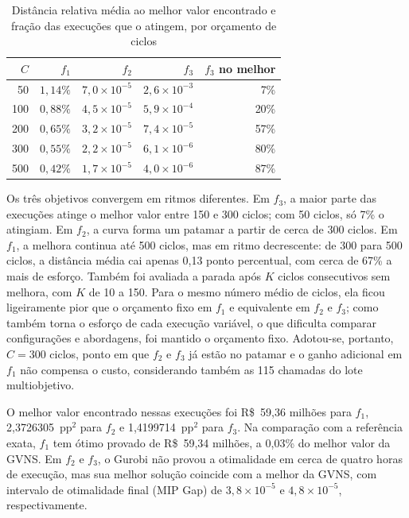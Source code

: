 \documentclass[conference]{IEEEtran}
\begin{document}
\begin{table}[htbp]
\caption{Distância relativa média ao melhor valor encontrado e fração das execuções que o atingem, por orçamento de ciclos}
\centering
\begin{tabular}{r r r r r}
\toprule
\textbf{$C$} & \textbf{$f_1$} & \textbf{$f_2$} & \textbf{$f_3$} & \textbf{$f_3$ no melhor} \\
\midrule
50 & $1{,}14\%$ & $7{,}0\times10^{-5}$ & $2{,}6\times10^{-3}$ & 7\% \\
100 & $0{,}88\%$ & $4{,}5\times10^{-5}$ & $5{,}9\times10^{-4}$ & 20\% \\
200 & $0{,}65\%$ & $3{,}2\times10^{-5}$ & $7{,}4\times10^{-5}$ & 57\% \\
300 & $0{,}55\%$ & $2{,}2\times10^{-5}$ & $6{,}1\times10^{-6}$ & 80\% \\
500 & $0{,}42\%$ & $1{,}7\times10^{-5}$ & $4{,}0\times10^{-6}$ & 87\% \\
\bottomrule
\end{tabular}
\label{tab:parada}
\end{table}

Os três objetivos convergem em ritmos diferentes. Em $f_3$, a maior parte das execuções atinge o melhor valor entre 150 e 300 ciclos; com 50 ciclos, só 7\% o atingiam. Em $f_2$, a curva forma um patamar a partir de cerca de 300 ciclos. Em $f_1$, a melhora continua até 500 ciclos, mas em ritmo decrescente: de 300 para 500 ciclos, a distância média cai apenas 0{,}13 ponto percentual, com cerca de 67\% a mais de esforço. Também foi avaliada a parada após $K$ ciclos consecutivos sem melhora, com $K$ de 10 a 150. Para o mesmo número médio de ciclos, ela ficou ligeiramente pior que o orçamento fixo em $f_1$ e equivalente em $f_2$ e $f_3$; como também torna o esforço de cada execução variável, o que dificulta comparar configurações e abordagens, foi mantido o orçamento fixo. Adotou-se, portanto, $C=300$ ciclos, ponto em que $f_2$ e $f_3$ já estão no patamar e o ganho adicional em $f_1$ não compensa o custo, considerando também as 115 chamadas do lote multiobjetivo.

O melhor valor encontrado nessas execuções foi R\$~59{,}36 milhões para $f_1$, 2{,}3726305~pp$^2$ para $f_2$ e 1{,}4199714~pp$^2$ para $f_3$. Na comparação com a referência exata, $f_1$ tem ótimo provado de R\$~59{,}34 milhões, a 0{,}03\% do melhor valor da GVNS. Em $f_2$ e $f_3$, o Gurobi não provou a otimalidade em cerca de quatro horas de execução, mas sua melhor solução coincide com a melhor da GVNS, com intervalo de otimalidade final (MIP Gap) de $3{,}8\times10^{-5}$ e $4{,}8\times10^{-5}$, respectivamente.
\end{document}
